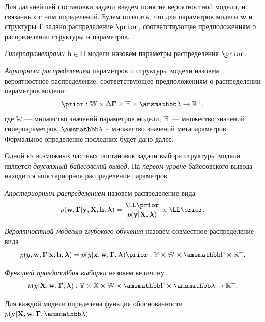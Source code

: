 Для дальнейшей постановки задачи введем понятие вероятностной модели, и связанных с ним определений. Будем полагать, что для параметров модели $\mathbf{w}$ и структуры  $\boldsymbol{\Gamma}$ задано распределение $\prior$, соответствующее предположениям о распределении структуры и параметров. 

\begin{defin}
\textit{Гиперпараметрами} $\mathbf{h}\in \mathbb{H}$ модели  назовем параметры распределения $\prior$.
\end{defin}

\begin{defin}
\textit{Априорным распределением} параметров и структуры модели назовем вероятностное распределение, соответствующее предположениям о распределении параметров модели:
\[
    \prior: \mathbb{W} \times \Delta{\boldsymbol{\Gamma}} \times \mathbb{H} \times \Lamb \to \mathbb{R}^{+}, 
\]
где $\mathbb{W}$ --- множество значений параметров модели, $\mathbb{H}$ --- множество значений гиперпараметров, $\Lamb$ -- множество значений метапараметров. Формальное определение последних будет дано далее.
\end{defin}


Одной из возможных частных постановок задачи выбора структуры модели является \textit{двусвязный байесовский вывод.} 
На \textit{первом уровне} байесовского вывода  находится апостериорное распределение параметров.

\begin{defin}
\textit{Апостериорным распределением} назовем распределение вида
\begin{equation}
\label{eq:posterior}
    \post = \frac{\LL \prior}{p(\mathbf{y}|\mathbf{X}, \lam)} \propto \LL \prior.%
\end{equation}
\end{defin}

\begin{defin}
\textit{Вероятностной моделью глубокого обучения} назовем совместное распределение вида
\[
    p({y}, \mathbf{w},  \boldsymbol{\Gamma}|\mathbf{x}, \mathbf{h}, \lam) = p({y}|\mathbf{x}, \mathbf{w},  \boldsymbol{\Gamma}, \lam)\prior: \yb \times \mathbb{W}  \times \Gb  \times \mathbb{R}^{+}.
\]
\end{defin}

\begin{defin}
\textit{Функцией правдоподбия выборки } назовем величину
\[
    p(y|\mathbf{X}, \mathbf{w}, \boldsymbol{\Gamma}, \lam): \yb \times \mathbb{X} \times \mathbb{W} \times \Gb \times \Lamb \to \mathbb{R}^{+}.
\]
\end{defin}
Для каждой модели определена функция обоснованности  $p(\mathbf{y}|\mathbf{X}, \mathbf{w}, \boldsymbol{\Gamma}, \Lamb)$.
 
